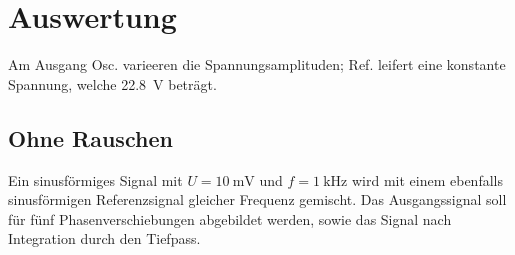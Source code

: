 \section{Auswertung}
\label{sec:Auswertung}

Am Ausgang Osc. varieeren die Spannungsamplituden; Ref. leifert eine konstante Spannung, welche \SI {22,8}{\volt} beträgt.

\subsection{Ohne Rauschen}
Ein sinusförmiges Signal mit $U = \SI{10}{\milli \volt}$ und $f = \SI{1}{\kilo \Hz}$ wird mit einem ebenfalls sinusförmigen Referenzsignal gleicher Frequenz gemischt. Das Ausgangssignal soll für fünf Phasenverschiebungen abgebildet werden, sowie das Signal nach Integration durch den Tiefpass.

